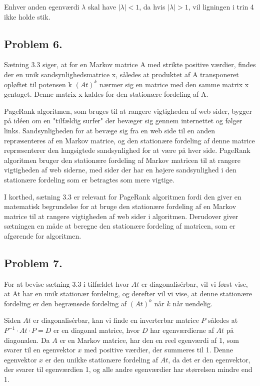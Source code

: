 Enhver anden egenværdi $\lambda$ skal have $|\lambda| < 1$, da hvis $|\lambda| > 1$, vil ligningen i trin 4 ikke holde stik.


\subsection*{Problem 6.}

Sætning 3.3 siger, at for en Markov matrice A med strikte positive værdier, findes der en unik sandsynlighedsmatrice x, således at produktet af A transponeret opløftet til potensen k $(At)^k$ nærmer sig en matrice med den samme matrix x gentaget. Denne matrix x kaldes for den stationære fordeling af A.

PageRank algoritmen, som bruges til at rangere vigtigheden af web sider, bygger på idéen om en "tilfældig surfer" der bevæger sig gennem internettet og følger links. Sandsynligheden for at bevæge sig fra en web side til en anden repræsenteres af en Markov matrice, og den stationære fordeling af denne matrice repræsenterer den langsigtede sandsynlighed for at være på hver side. PageRank algoritmen bruger den stationære fordeling af Markov matricen til at rangere vigtigheden af web siderne, med sider der har en højere sandsynlighed i den stationære fordeling som er betragtes som mere vigtige.

I korthed, sætning 3.3 er relevant for PageRank algoritmen fordi den giver en matematisk begrundelse for at bruge den stationære fordeling af en Markov matrice til at rangere vigtigheden af web sider i algoritmen. Derudover giver sætningen en måde at beregne den stationære fordeling af matricen, som er afgørende for algoritmen.

\subsection*{Problem 7.}

For at bevise sætning 3.3 i tilfældet hvor $At$ er diagonalisérbar, vil vi først vise, at At har en unik stationær fordeling, og derefter vil vi vise, at denne stationære fordeling er den begrænsede fordeling af $(At)^k$ når $k$ når uendelig.

Siden $At$ er diagonalisérbar, kan vi finde en inverterbar matrice $P$ således at $P^{-1} \cdot At \cdot P = D$ er en diagonal matrice, hvor $D$ har egenværdierne af $At$ på diagonalen.
Da $A$ er en Markov matrice, har den en reel egenværdi af 1, som svarer til en egenvektor $x$ med positive værdier, der summeres til 1. Denne egenvektor $x$ er den unikke stationære fordeling af $At$, da det er den egenvektor, der svarer til egenværdien 1, og alle andre egenværdier har størrelsen mindre end 1.

